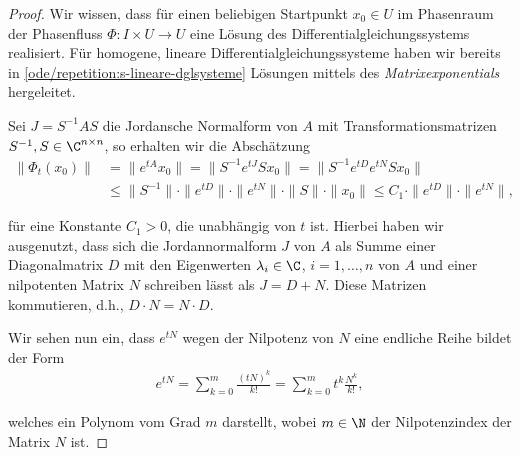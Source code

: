 \documentclass[letterpaper,10pt,german]{jupyterBook}
\begin{document}
\begin{proof}
 Wir wissen, dass für einen beliebigen Startpunkt \(x_0 \in U\) im Phasenraum der Phasenfluss \(\Phi \colon I \times U \rightarrow U\) eine Lösung des Differentialgleichungssystems realisiert.
Für homogene, lineare Differentialgleichungssysteme haben wir bereits in \cref{ode/repetition:s-lineare-dglsysteme}  Lösungen mittels des \emph{Matrixexponentials} hergeleitet.

\par
Sei \(J = S^{-1}AS\) die Jordansche Normalform von \(A\) mit Transformationsmatrizen \(S^{-1},S \in \C^{n \times n}\), so erhalten wir die Abschätzung
\begin{align*}
\|\Phi_t(x_0)\| &= \|e^{tA}x_0\| = \|S^{-1}e^{tJ}Sx_0\| = \|S^{-1}e^{tD}e^{tN}Sx_0\| \\
&\leq \|S^{-1}\| \cdot \|e^{tD}\| \cdot \|e^{tN}\| \cdot \|S\| \cdot \|x_0\| \leq C_1 \cdot \|e^{tD}\| \cdot \|e^{t N}\|,
\end{align*}
\par
für eine Konstante \(C_1 > 0\), die unabhängig von \(t\) ist.
Hierbei haben wir ausgenutzt, dass sich die Jordannormalform \(J\) von \(A\) als Summe einer Diagonalmatrix \(D\) mit den Eigenwerten \(\lambda_i \in \C\), \(i=1,\ldots,n\) von \(A\) und einer nilpotenten Matrix \(N\) schreiben lässt als \(J = D + N\).
Diese Matrizen kommutieren, d.h., \(D \cdot N = N \cdot D\).

\par
Wir sehen nun ein, dass \(e^{tN}\) wegen der Nilpotenz von \(N\) eine endliche Reihe bildet der Form
\begin{align*}
e^{tN} = \sum_{k=0}^m \frac{(tN)^k}{k!} = \sum_{k=0}^m t^k\frac{N^k}{k!},
\end{align*}
\par
welches ein Polynom vom Grad \(m\) darstellt, wobei \(m \in \N\) der Nilpotenzindex der Matrix \(N\) ist.


\end{proof}
\end{document}
